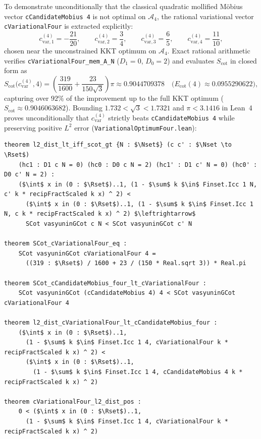 \documentclass[11pt,a4paper]{article}
\theoremstyle{definition}
\newcommand{\Nset}{\mathbb{N}}
\newcommand{\Rset}{\mathbb{R}}
\begin{document}
To demonstrate unconditionally that the classical quadratic mollified M\"obius vector \texttt{cCandidateMobius 4} is not optimal on $\mathcal{A}_4$, the rational variational vector \texttt{cVariationalFour} is extracted explicitly:
\begin{equation}
c_{\mathrm{var},1}^{(4)} = -\frac{21}{20}, \qquad
c_{\mathrm{var},2}^{(4)} = \frac{3}{4}, \qquad
c_{\mathrm{var},3}^{(4)} = \frac{6}{5}, \qquad
c_{\mathrm{var},4}^{(4)} = \frac{11}{10},
\end{equation}
chosen near the unconstrained KKT optimum on $\mathcal{A}_4$. Exact rational arithmetic verifies \texttt{cVariationalFour\_\allowbreak mem\_\allowbreak A\_\allowbreak N} ($D_1 = 0$, $D_0 = 2$) and evaluates $S_{\mathrm{cot}}$ in closed form as
\begin{equation}
S_{\mathrm{cot}}\big(c_{\mathrm{var}}^{(4)}, 4\big)
= \left(\frac{319}{1600} + \frac{23}{150\sqrt{3}}\right)\pi \approx 0.9044709378
\quad \big(E_{\mathrm{cot}}(4) \approx 0.0955290622\big),
\end{equation}
capturing over $92\%$ of the improvement up to the full KKT optimum ($S_{\mathrm{cot}} \approx 0.9046063682$). Bounding $1.732 < \sqrt{3} < 1.7321$ and $\pi < 3.1416$ in Lean~4 proves unconditionally that $c_{\mathrm{var}}^{(4)}$ strictly beats \texttt{cCandidateMobius 4} while preserving positive $L^2$ error (\texttt{VariationalOptimumFour.lean}):
\begin{lstlisting}
theorem l2_dist_lt_iff_scot_gt {N : $\Nset$} (c c' : $\Nset \to \Rset$)
    (hc1 : D1 c N = 0) (hc0 : D0 c N = 2) (hc1' : D1 c' N = 0) (hc0' : D0 c' N = 2) :
    ($\int$ x in (0 : $\Rset$)..1, (1 - $\sum$ k $\in$ Finset.Icc 1 N, c' k * recipFractScaled k x) ^ 2) <
      ($\int$ x in (0 : $\Rset$)..1, (1 - $\sum$ k $\in$ Finset.Icc 1 N, c k * recipFractScaled k x) ^ 2) $\leftrightarrow$
      SCot vasyuninGCot c N < SCot vasyuninGCot c' N

theorem SCot_cVariationalFour_eq :
    SCot vasyuninGCot cVariationalFour 4 =
      ((319 : $\Rset$) / 1600 + 23 / (150 * Real.sqrt 3)) * Real.pi

theorem SCot_cCandidateMobius_four_lt_cVariationalFour :
    SCot vasyuninGCot (cCandidateMobius 4) 4 < SCot vasyuninGCot cVariationalFour 4

theorem l2_dist_cVariationalFour_lt_cCandidateMobius_four :
    ($\int$ x in (0 : $\Rset$)..1,
      (1 - $\sum$ k $\in$ Finset.Icc 1 4, cVariationalFour k * recipFractScaled k x) ^ 2) <
      ($\int$ x in (0 : $\Rset$)..1,
        (1 - $\sum$ k $\in$ Finset.Icc 1 4, cCandidateMobius 4 k * recipFractScaled k x) ^ 2)

theorem cVariationalFour_l2_dist_pos :
    0 < ($\int$ x in (0 : $\Rset$)..1,
      (1 - $\sum$ k $\in$ Finset.Icc 1 4, cVariationalFour k * recipFractScaled k x) ^ 2)
\end{lstlisting}
\end{document}
